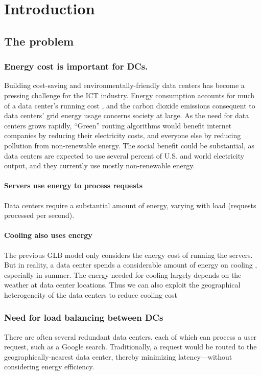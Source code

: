 \documentclass{acm_proc_article-sp}
\begin{document}
\section{Introduction}


\subsection{The problem}
	\subsubsection{Energy cost is important for DCs.}
		Building cost-saving and environmentally-friendly data centers has become a pressing challenge for the ICT industry.
		Energy consumption accounts for much of a data center’s running cost \cite{datacenter}, and the carbon dioxide emissions consequent to data centers’ grid energy usage concerns society at large.
		As the need for data centers grows rapidly,
		“Green” routing algorithms would benefit internet companies by reducing their electricity costs, and everyone else by reducing pollution from non-renewable energy. The social benefit could be substantial, as data centers are expected to use several percent of U.S. and world electricity output, and they currently use mostly non-renewable energy.
		
		\paragraph{Servers use energy to process requests}
			Data centers require a substantial amount of energy, varying with load (requests processed per second).
		\paragraph{Cooling also uses energy}
			The previous GLB model only considers the energy cost of running the servers. But in reality, a data center spends a considerable amount of energy on cooling \cite{datacenter}, especially in summer. The energy needed for cooling largely depends on the weather at data center locations. Thus we can also exploit the geographical heterogeneity of the data centers to reduce cooling cost
	\subsubsection{Need for load balancing between DCs}
		There are often several redundant data centers, each of which can process a user request, such as a Google search. Traditionally, a request would be routed to the geographically-nearest data center, thereby minimizing latency—without considering energy efficiency.
\end{document}
